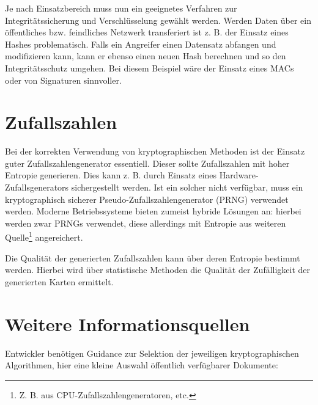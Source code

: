 Je nach Einsatzbereich muss nun ein geeignetes Verfahren zur Integritätssicherung und Verschlüsselung gewählt werden. Werden Daten über ein öffentliches bzw. feindliches Netzwerk transferiert ist z. B. der Einsatz eines Hashes problematisch. Falls ein Angreifer einen Datensatz abfangen und modifizieren kann, kann er ebenso einen neuen Hash berechnen und so den Integritätsschutz umgehen. Bei diesem Beispiel wäre der Einsatz eines MACs oder von Signaturen sinnvoller.

\section{Zufallszahlen}

Bei der korrekten Verwendung von kryptographischen Methoden ist der Einsatz guter Zufallszahlengenerator essentiell. Dieser sollte Zufallszahlen mit hoher Entropie generieren. Dies kann z. B. durch Einsatz eines Hardware-Zufallsgenerators sichergestellt werden. Ist ein solcher nicht verfügbar, muss ein kryptographisch sicherer Pseudo-Zufallszahlengenerator (PRNG) verwendet werden. Moderne Betriebssysteme bieten zumeist hybride Lösungen an: hierbei werden zwar PRNGs verwendet, diese allerdings mit Entropie aus weiteren Quelle\footnote{Z. B. aus CPU-Zufallszahlengeneratoren, etc.} angereichert.

Die Qualität der generierten Zufallszahlen kann über deren Entropie bestimmt werden. Hierbei wird über statistische Methoden die Qualität der Zufälligkeit der generierten Karten ermittelt.

\section{Weitere Informationsquellen}

Entwickler benötigen Guidance zur Selektion der jeweiligen kryptographischen Algorithmen, hier eine kleine Auswahl öffentlich verfügbarer Dokumente:

